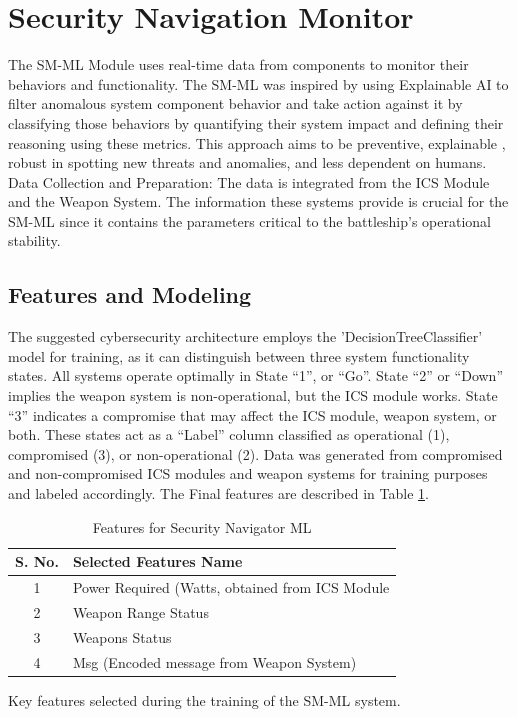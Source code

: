 \documentclass[conference]{IEEEtran}
\begin{document}
\section{Security Navigation Monitor}
The SM-ML Module uses real-time data from components to monitor their behaviors and functionality. The SM-ML was inspired by using Explainable AI to filter anomalous system component behavior and take action against it by classifying those behaviors by quantifying their system impact and defining their reasoning using these metrics. This approach aims to be preventive, explainable \cite{b5}, robust in spotting new threats and anomalies, and less dependent on humans. 
Data Collection and Preparation: The data is integrated from the ICS Module and the Weapon System. The information these systems provide is crucial for the SM-ML since it contains the parameters critical to the battleship's operational stability. 


\subsection{Features and Modeling}
The suggested cybersecurity architecture employs the 'DecisionTreeClassifier' model for training, as it can distinguish between three system functionality states. All systems operate optimally in State ``1'', or ``Go''. State ``2'' or ``Down'' implies the weapon system is non-operational, but the ICS module works. State ``3'' indicates a compromise that may affect the ICS module, weapon system, or both. These states act as a ``Label'' column classified as operational (1), compromised (3), or non-operational (2). Data was generated from compromised and non-compromised ICS modules and weapon systems for training purposes and labeled accordingly.
The Final features are described in Table \ref{tab:sec_feature}. 
\begin{table}
\centering
\caption{Features for Security Navigator ML}
\label{tab:sec_feature}
\begin{tabular}{cl}
\toprule
\textbf{S. No.} & \textbf{Selected Features Name} \\
\midrule
1 & Power Required (Watts, obtained from ICS Module \\
2 & Weapon Range Status \\
3 & Weapons Status  \\
4 & Msg (Encoded message from Weapon System) \\
\bottomrule
\end{tabular}
\begin{minipage}{0.44\textwidth} 
\footnotesize Key features selected during the training of the SM-ML system.
\end{minipage}
\end{table}
\end{document}
